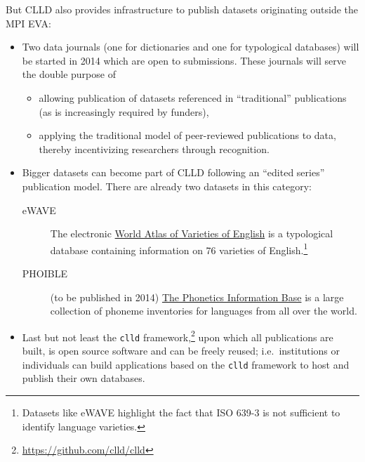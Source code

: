 \documentclass[a4paper,10pt]{article}
\begin{document}
But CLLD also provides infrastructure to publish datasets originating outside the MPI EVA:
\begin{itemize}
\item Two data journals (one for dictionaries and one for typological databases) will be started
in 2014 which are open to submissions. These journals will serve the double purpose of
\begin{itemize}
\item allowing publication of datasets referenced in ``traditional'' publications (as is
increasingly required by funders),
\item applying the traditional model of peer-reviewed publications to data, thereby incentivizing
researchers through recognition.
\end{itemize}
\item Bigger datasets can become part of CLLD following an ``edited series'' publication model.
There are already two datasets in this category:
\begin{description}
\item[eWAVE] The electronic \href{http://ewave-atlas.org/}{World Atlas of Varieties of English} is
a typological database containing information on 76 varieties of English.\footnote{Datasets like
eWAVE highlight the fact that ISO 639-3 is not sufficient to identify language varieties.}
\item[PHOIBLE] (to be published in 2014) \href{http://phoible.org}{The Phonetics Information Base}
is a large collection of phoneme inventories for languages from all over the world.
\end{description}
\item Last but not least the \texttt{clld} framework,\footnote{\url{https://github.com/clld/clld}}
upon which all publications are built, is open source software and can be freely reused; i.e.~institutions
or individuals can build applications based on the \texttt{clld} framework to host and publish their own databases.
\end{itemize}
\end{document}
